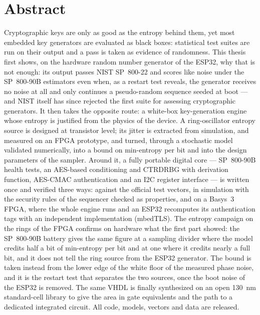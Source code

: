 \documentclass[12pt, a4paper, oneside]{report}
\begin{document}
\chapter*{Abstract}

Cryptographic keys are only as good as the entropy behind them, yet most
embedded key generators are evaluated as black boxes: statistical test
suites are run on their output and a pass is taken as evidence of
randomness. This thesis first shows, on the hardware random number
generator of the ESP32, why that is not enough: its output passes NIST
SP~800-22 and scores like noise under the SP~800-90B estimators even
when, as a restart test reveals, the generator receives no noise at all
and only continues a pseudo-random sequence seeded at boot ---
and NIST itself has since rejected the first suite for assessing
cryptographic generators. It then takes the opposite route: a white-box
key-generation engine whose entropy
is justified from the physics of the device. A ring-oscillator entropy
source is designed at transistor level; its jitter is extracted from
simulation, and measured on an FPGA prototype, and turned, through a
stochastic model validated numerically, into a bound on min-entropy per bit
and into the design parameters of the sampler. Around it, a fully
portable digital core --- SP~800-90B health tests, an AES-based
conditioning and \acs{CTRDRBG} with derivation function, AES-CMAC
authentication and an \acs{I2C} register interface --- is written once
and verified three ways: against the official test vectors, in
simulation with the security rules of the sequencer checked as
properties, and on a Basys~3 FPGA, where the whole engine runs and an
ESP32 recomputes its authentication tags with an independent
implementation (mbedTLS). The entropy campaign on the rings of the FPGA
confirms on hardware what the first part showed: the SP~800-90B battery
gives the same figure at a sampling divider where the model credits half
a bit of min-entropy per bit and at one where it credits nearly a full
bit, and it does not tell the ring source from the ESP32 generator. The
bound is taken instead from the lower edge of the white floor of the
measured phase noise, and it is the restart test that separates the two
sources, once the boot noise of the ESP32 is removed. The same VHDL
is finally
synthesized on an open 130~nm standard-cell library to give the area in
gate equivalents and the path to a dedicated integrated circuit. All
code, models, vectors and data are released.
\end{document}

